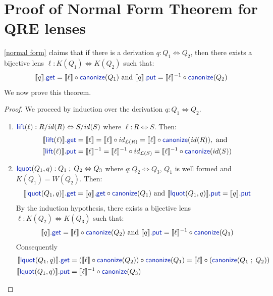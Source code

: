 \documentclass[acmsmall,screen]{acmart}
\newcommand{\kw}[1]{\textcolor{dkblue}{\ensuremath{\mathsf{#1}}}}
\newcommand{\canonize}{\ensuremath{\kw{canonize}}}
\newcommand{\get}{\ensuremath{\kw{get}}}
\newcommand{\lput}{\ensuremath{\kw{put}}}
\newcommand{\lquot}{\ensuremath{\kw{lquot}}}
\begin{document}
\section{Proof of Normal Form Theorem for QRE lenses}
\cref{normal form} claims that if there is a derivation $q : Q_1
\Leftrightarrow Q_2$, then there exists a bijective lens $\ell : K(Q_1)
\Leftrightarrow K(Q_2)$ such that:
$$
\llbracket q \rrbracket.\get = \llbracket \ell \rrbracket\circ
\canonize(Q_1) \text{ and } 
\llbracket q \rrbracket.\lput = \llbracket \ell \rrbracket^{-1} \circ
\canonize(Q_2)
$$
We now prove this theorem.
\begin{proof}
We proceed by induction over the derivation $q : Q_1 \Leftrightarrow Q_2$.
\begin{enumerate}
  \item
  $\kw{lift}(\ell): R/\mathit{id}(R) \Leftrightarrow S/\mathit{id}(S)$ where
  $\ell : R \Leftrightarrow S$. Then:
  \begin{align*}
\llbracket \kw{lift}(\ell) \rrbracket.\get &=  \llbracket \ell \rrbracket
= \llbracket \ell \rrbracket \circ id_{\mathcal{L}(R)} =
\llbracket \ell \rrbracket \circ \canonize(\mathit{id}(R)), \text{ and }\\
\llbracket \kw{lift}(\ell) \rrbracket.\lput &= \llbracket \ell
\rrbracket^{-1} = \llbracket \ell \rrbracket^{-1} \circ id_{\mathcal{L}(S)} =
\llbracket \ell \rrbracket^{-1} \circ \canonize(id(S))
\end{align*}
\item
$\lquot(Q_1, q): Q_1 \; ; \; Q_2 \Leftrightarrow Q_3$ where $q : Q_2
\Leftrightarrow Q_3$, $Q_1$ is well formed and $K(Q_1) = W(Q_2)$. Then:
$$
\llbracket \lquot(Q_1, q) \rrbracket.\get  = \llbracket q
\rrbracket.\get \circ \canonize(Q_1) \text{ and }
\llbracket \lquot(Q_1, q) \rrbracket.\lput = \llbracket q \rrbracket.\lput
$$
By the induction hypothesis, there exists a bijective lens $\ell :
K(Q_2) \Leftrightarrow K(Q_3)$ such that:
$$
\llbracket q \rrbracket.\get = \llbracket \ell \rrbracket \circ
\canonize(Q_2) \text{ and }
\llbracket q \rrbracket.\lput = \llbracket \ell \rrbracket^{-1} \circ
\canonize(Q_3)
$$
Consequently
\begin{align*}
\llbracket \lquot(Q_1, q)\rrbracket.\get  &= (\llbracket \ell \rrbracket \circ
\canonize(Q_2)) \circ \canonize(Q_1) = \llbracket \ell \rrbracket \circ
(\canonize(Q_1 \; ; \; Q_2))\\
\llbracket \lquot(Q_1, q) \rrbracket.\lput &= \llbracket \ell \rrbracket^{-1}
\circ \canonize(Q_3)
\end{align*}


\end{enumerate}
\end{proof}
\end{document}
